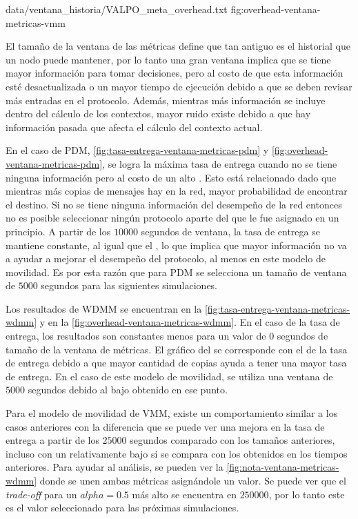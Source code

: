 {
{data/ventana_historia/VALPO_meta_overhead.txt}
}{fig:overhead-ventana-metricas-vmm}


El tamaño de la ventana de las métricas define que tan antiguo es el historial
que un nodo puede mantener, por lo tanto una gran ventana implica que se tiene
mayor información para tomar decisiones, pero al costo de que esta información
esté desactualizada o un mayor tiempo de ejecución debido a que se deben revisar
más entradas en el protocolo. Además, mientras más información se incluye dentro
del cálculo de los contextos, mayor ruido existe debido a que hay información
pasada que afecta el cálculo del contexto actual.


En el caso de PDM, \ref{fig:tasa-entrega-ventana-metricas-pdm} y
\ref{fig:overhead-ventana-metricas-pdm}, se logra la máxima tasa de entrega
cuando no se tiene ninguna información pero al costo de un alto \overhead. Esto
está relacionado dado que mientras más copias de mensajes hay en la red, mayor
probabilidad de encontrar el destino. Si no se tiene ninguna información del
desempeño de la red entonces no es posible seleccionar ningún protocolo aparte
del que le fue asignado en un principio. A partir de los $10000$ segundos de
ventana, la tasa de entrega se mantiene constante, al igual que el \overhead, lo
que implica que mayor información no va a ayudar a mejorar el desempeño del
protocolo, al menos en este modelo de movilidad. Es por esta razón que para PDM
se selecciona un tamaño de ventana de $5000$ segundos para las siguientes
simulaciones.


Los resultados de WDMM se encuentran en la
\ref{fig:tasa-entrega-ventana-metricas-wdmm} y en la
\ref{fig:overhead-ventana-metricas-wdmm}. En el caso de la tasa de entrega, los
resultados son constantes menos para un valor de $0$ segundos de tamaño de la
ventana de métricas. El gráfico del \overhead{} se corresponde con el de la tasa
de entrega debido a que mayor cantidad de copias ayuda a tener una mayor tasa de
entrega. En el caso de este modelo de movilidad, se utiliza una ventana de
$5000$ segundos debido al bajo \overhead{} obtenido en ese punto.



Para el modelo de movilidad de VMM, existe un comportamiento similar a los
casos anteriores con la diferencia que se puede ver una mejora en la tasa de
entrega a partir de los $25000$ segundos comparado con los tamaños anteriores,
incluso con un \overhead{} relativamente bajo si se compara con los obtenidos en
los tiempos anteriores. Para ayudar al análisis, se pueden ver la
\ref{fig:nota-ventana-metricas-wdmm} donde se unen ambas métricas asignándole un
valor. Se puede ver que el \textit{trade-off} para un $alpha = 0.5$ más alto se
encuentra en $250000$, por lo tanto este es el valor seleccionado para las
próximas simulaciones.


